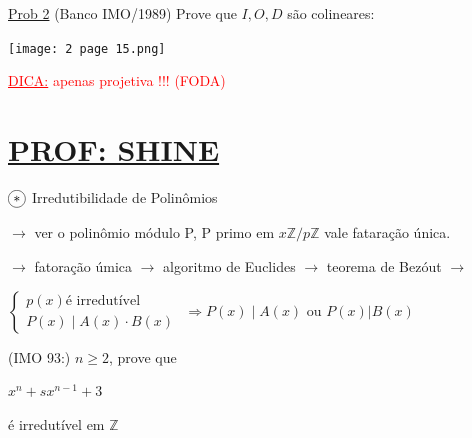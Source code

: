 \documentclass[a4paper,12pt]{article}
\renewcommand{\geq}{\ensuremath{\geqslant}}
\theoremstyle{plain} %
\theoremstyle{definition} %
\theoremstyle{remark} %
\newcommand*\circled[1]{\tikz[baseline=(char.base)]{
		\node[shape=circle,draw,inner sep=2pt] (char) {#1};}}%
\begin{document}
	\vspace{1ex}\underline{Prob 2} (Banco IMO/1989) Prove que $I, O, D$ s\~ao colineares:
	
	\begin{center}
		\texttt{[image: 2 page 15.png]}
	\end{center}
	
	\textcolor{red}{\underline{DICA:} apenas projetiva !!! (FODA)}
	
	\section*{\underline{PROF: SHINE}}
	
	$\circled{$\ast$}$ \hspace{1em} Irredutibilidade de Polin\^omios
	
	$\rightarrow$ ver o polin\^omio m\'odulo P, P primo em $x\mathds{Z}/p\mathds{Z}$ vale fatara\c{c}\~ao \'unica.
	
	$\rightarrow$ fatora\c{c}\~ao \'umica $\rightarrow$ algoritmo de Euclides $\rightarrow$ teorema de Bez\'out $\rightarrow$
	
	\vspace{1ex}
	$\left\{\begin{array}{l} p(x) \text{\'e irredut\'ivel} \\ P(x) \mid A(x) \cdot B(x)\end{array}\right.$ $\Rightarrow P(x) \mid A(x)$ ou $P(x)|B(x)$
	\vspace{1ex}
	
	(IMO 93:) $n\geq 2$, prove que
	
	\begin{center}
		$x^n+sx^{n-1}+3$
	\end{center}
	
	\'e irredut\'ivel em $\mathds{Z}$
	
\end{document}
